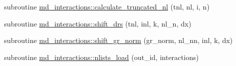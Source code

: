 \begin{DoxyCompactItemize}
\item 
subroutine \mbox{\hyperlink{namespacemd__interactions_abc7ac3a3b1e9382804836d43cdc9a224}{md\+\_\+interactions\+::calculate\+\_\+truncated\+\_\+nl}} (tnl, nl, i, n)
\item 
subroutine \mbox{\hyperlink{namespacemd__interactions_a4cbfd0c1d189320866efb63454722170}{md\+\_\+interactions\+::shift\+\_\+drs}} (tnl, inl, k, nl\+\_\+n, dx)
\item 
subroutine \mbox{\hyperlink{namespacemd__interactions_a2c4725fefbad36399f5de45a222b5d4e}{md\+\_\+interactions\+::shift\+\_\+gr\+\_\+norm}} (gr\+\_\+norm, nl\+\_\+nn, inl, k, dx)
\item 
subroutine \mbox{\hyperlink{namespacemd__interactions_a5787116d9c766f3d3ec6355c299d58c2}{md\+\_\+interactions\+::nlists\+\_\+load}} (out\+\_\+id, interactions)
\end{DoxyCompactItemize}
